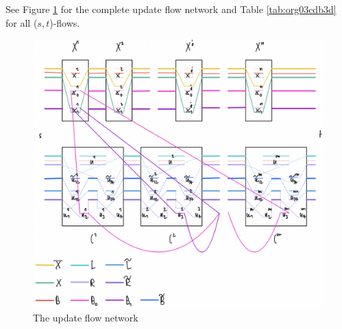 \documentclass[fontsize=11pt,paper=a4]{book}
\begin{document}
See Figure \ref{fig:org373a77b} for the complete update flow network and Table \ref{tab:org03cdb3d} for all (\(s,t\))-flows.

\begin{figure}[htbp]
\centering
\includegraphics[width=.9\linewidth]{../assets/Screen Shot 2023-02-14 at 15.08.01.png}
\caption{\label{fig:org373a77b}The update flow network}
\end{figure}
\end{document}

